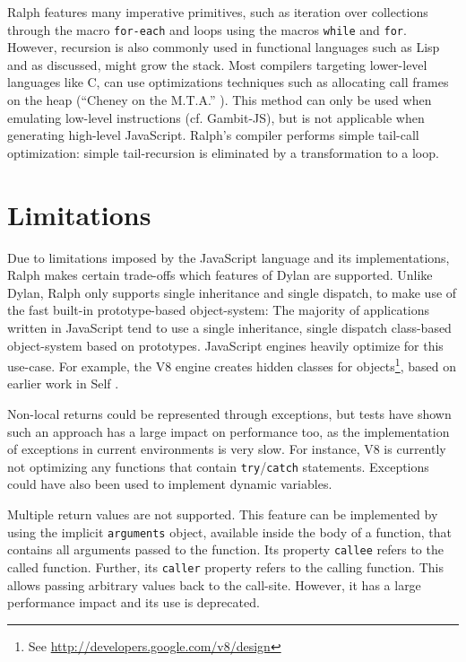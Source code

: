 \documentclass{acm_proc_article-sp}
\begin{document}
Ralph features many imperative primitives, such as iteration over
collections through the macro \texttt{for-each} and loops using the
macros \texttt{while} and \texttt{for}. However, recursion is also
commonly used in functional languages such as Lisp and as discussed,
might grow the stack. Most compilers targeting lower-level languages
like C, can use optimizations techniques such as allocating call
frames on the heap (``Cheney on the M.T.A.'' \cite{baker1995}). This
method can only be used when emulating low-level instructions
(cf. Gambit-JS), but is not applicable when generating high-level
JavaScript.  Ralph's compiler performs simple tail-call optimization:
simple tail-recursion is eliminated by a transformation to a loop.

\section{Limitations}\label{sec:limitations}

Due to limitations imposed by the JavaScript language and its
implementations, Ralph makes certain trade-offs which features of
Dylan are supported. Unlike Dylan, Ralph only supports single
inheritance and single dispatch, to make use of the fast built-in
prototype-based object-system: The majority of applications written in
JavaScript tend to use a single inheritance, single dispatch
class-based object-system based on prototypes. JavaScript engines
heavily optimize for this use-case. For example, the V8 engine creates
hidden classes for objects\footnote{See
  \url{http://developers.google.com/v8/design}},
based on earlier work in Self \cite{chambers1989}.

Non-local returns could be represented through exceptions, but tests
have shown such an approach has a large impact on performance too, as
the implementation of exceptions in current environments is very
slow. For instance, V8 is currently not optimizing any functions that
contain \texttt{try}/\texttt{catch} statements. Exceptions could have
also been used to implement dynamic variables.

\vspace{-0.3em}
Multiple return values are not supported. This feature can be
implemented by using the implicit \texttt{arguments} object, available
inside the body of a function, that contains all arguments passed to the
function. Its property \texttt{callee} refers to the called function.
Further, its \texttt{caller} property refers to the calling function.
This allows passing arbitrary values back to the call-site.
However, it has a large performance impact and its use is deprecated.
\end{document}
